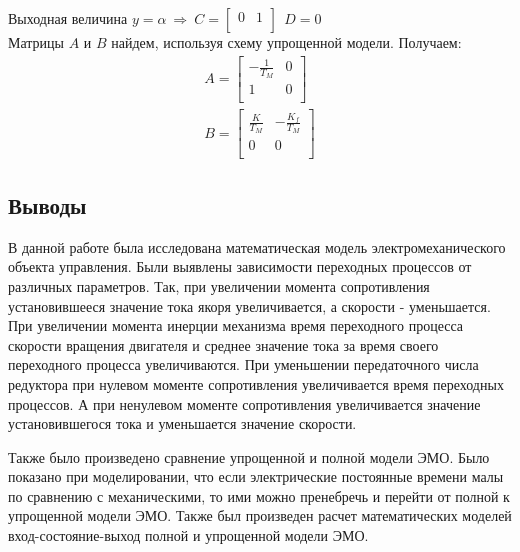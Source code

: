 \documentclass[a4paper,12pt]{article}
\begin{document}
		\noindent Выходная величина $y=\alpha ~\Rightarrow~ C=\begin{bmatrix}
		0 & 1\\ \end{bmatrix} ~~D=0$ \\
		Матрицы $A$ и $B$ найдем, используя схему упрощенной модели. Получаем:\\ 
		\begin{gather}
		\displaystyle A=\begin{bmatrix}
		-\frac{1}{T_M} & 0 \\
		1 & 0\\
		\end{bmatrix}\\ B=\begin{bmatrix}
		\frac{K}{T_M} & -\frac{K_f}{T_M} \\
		0 & 0 \\
		\end{bmatrix}
		\end{gather}
	\newpage
	\begin{center}
	\section{Выводы} 
	\end{center}
	\par
	В данной работе была исследована математическая модель электромеханического объекта управления. Были выявлены зависимости переходных процессов от различных параметров. Так, при увеличении момента сопротивления установившееся значение тока якоря увеличивается, а скорости - уменьшается. При увеличении момента инерции механизма время переходного процесса скорости вращения двигателя и среднее значение тока за время своего переходного процесса увеличиваются. При уменьшении передаточного числа редуктора при нулевом моменте сопротивления увеличивается время переходных процессов. А при ненулевом моменте сопротивления увеличивается значение установившегося тока и уменьшается значение скорости. 
	\par
	Также было произведено сравнение упрощенной и полной модели ЭМО. Было показано при моделировании, что если электрические постоянные времени малы по сравнению с механическими, то ими можно пренебречь и перейти от полной к упрощенной модели ЭМО. Также был произведен расчет математических моделей вход-состояние-выход полной и упрощенной модели ЭМО. 





 
\end{document}
